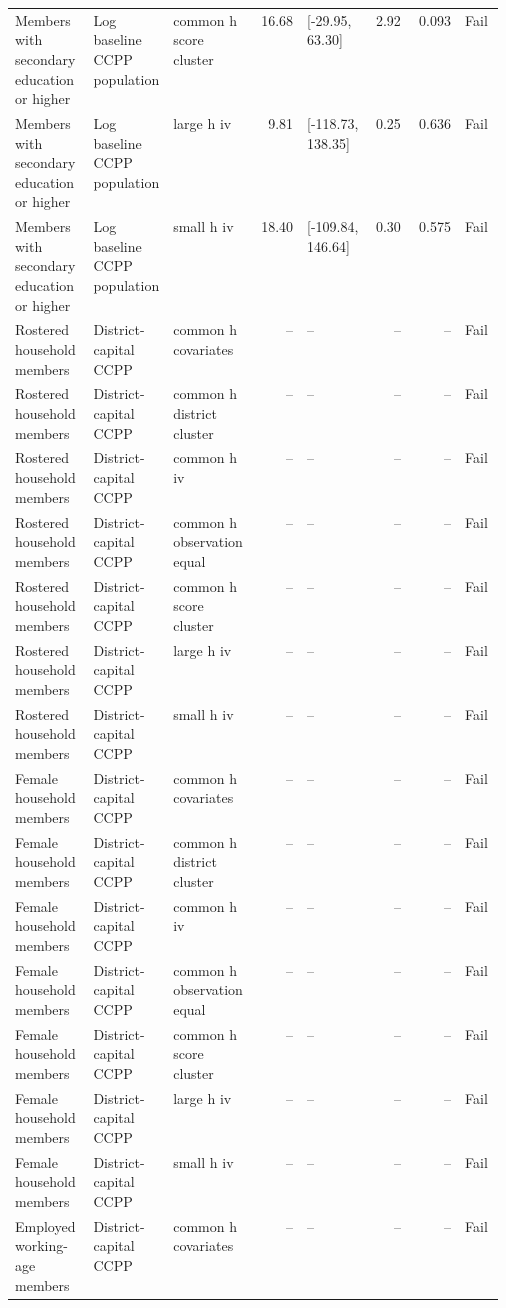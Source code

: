 \begin{longtable}{@{}p{0.16\linewidth}p{0.14\linewidth}p{0.14\linewidth}rp{0.13\linewidth}rrl@{}}
Members with secondary education or higher & Log baseline CCPP population & common h score cluster & 16.68 & [-29.95, 63.30] & 2.92 & 0.093 & Fail \\
Members with secondary education or higher & Log baseline CCPP population & large h iv & 9.81 & [-118.73, 138.35] & 0.25 & 0.636 & Fail \\
Members with secondary education or higher & Log baseline CCPP population & small h iv & 18.40 & [-109.84, 146.64] & 0.30 & 0.575 & Fail \\
Rostered household members & District-capital CCPP & common h covariates & -- & -- & -- & -- & Fail \\
Rostered household members & District-capital CCPP & common h district cluster & -- & -- & -- & -- & Fail \\
Rostered household members & District-capital CCPP & common h iv & -- & -- & -- & -- & Fail \\
Rostered household members & District-capital CCPP & common h observation equal & -- & -- & -- & -- & Fail \\
Rostered household members & District-capital CCPP & common h score cluster & -- & -- & -- & -- & Fail \\
Rostered household members & District-capital CCPP & large h iv & -- & -- & -- & -- & Fail \\
Rostered household members & District-capital CCPP & small h iv & -- & -- & -- & -- & Fail \\
Female household members & District-capital CCPP & common h covariates & -- & -- & -- & -- & Fail \\
Female household members & District-capital CCPP & common h district cluster & -- & -- & -- & -- & Fail \\
Female household members & District-capital CCPP & common h iv & -- & -- & -- & -- & Fail \\
Female household members & District-capital CCPP & common h observation equal & -- & -- & -- & -- & Fail \\
Female household members & District-capital CCPP & common h score cluster & -- & -- & -- & -- & Fail \\
Female household members & District-capital CCPP & large h iv & -- & -- & -- & -- & Fail \\
Female household members & District-capital CCPP & small h iv & -- & -- & -- & -- & Fail \\
Employed working-age members & District-capital CCPP & common h covariates & -- & -- & -- & -- & Fail \\

\end{longtable}
